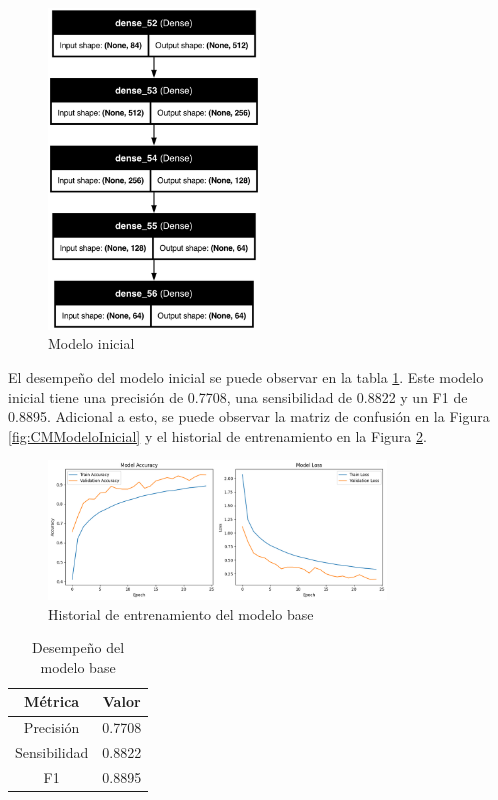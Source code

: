 \begin{figure}[H]
    \centering
    \includegraphics[width=0.5\textwidth]{figuras/baseModel.png}
    \caption{Modelo inicial}
    \label{fig:ModeloInicial}
\end{figure}

El desempeño del modelo inicial se puede observar en la tabla \ref{tab:DesempeñoModeloInicial}.
Este modelo inicial tiene una precisión de 0.7708, una sensibilidad de 0.8822 y un F1 de 0.8895.
Adicional a esto, se puede observar la matriz de confusión en la Figura \ref{fig:CMModeloInicial} y el historial de entrenamiento en la Figura \ref{fig:HistoryModeloInicial}.

\begin{figure}[H]
    \centering
    \includegraphics[width=0.8\textwidth]{figuras/baseModelHistory.png}
    \caption{Historial de entrenamiento del modelo base}
    \label{fig:HistoryModeloInicial}
\end{figure}

\begin{table}[H]
    \centering
    \begin{tabular}{|c|c|}
        \hline
        \textbf{Métrica} & \textbf{Valor} \\
        \hline
        Precisión & 0.7708 \\
        \hline
        Sensibilidad & 0.8822 \\
        \hline
        F1 & 0.8895 \\
        \hline
    \end{tabular}
    \caption{Desempeño del modelo base}
    \label{tab:DesempeñoModeloInicial}
\end{table}

